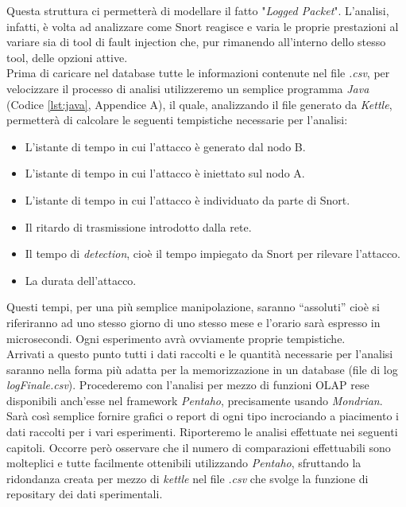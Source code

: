	Questa struttura ci permetterà di modellare il fatto "\textit{Logged Packet}". L'analisi, infatti, è volta ad analizzare come Snort reagisce e varia le proprie prestazioni al variare sia di tool di fault injection che, pur rimanendo all'interno dello stesso tool, delle opzioni attive.\\
	Prima di caricare nel database tutte le informazioni contenute nel file \textit{.csv}, per velocizzare il processo di analisi utilizzeremo un semplice programma \textit{Java} (Codice \ref{lst:java}, Appendice A), il quale, analizzando il file generato da \textit{Kettle}, permetterà di calcolare le seguenti tempistiche necessarie per l'analisi:
	\begin{itemize}
	    \item L'istante di tempo in cui l'attacco è generato dal nodo B.
	    \item L'istante di tempo in cui l'attacco è iniettato sul nodo A.
	    \item L'istante di tempo in cui l'attacco è individuato da parte di Snort.
	    \item Il ritardo di trasmissione introdotto dalla rete.
	    \item Il tempo di \textit{detection}, cioè il tempo impiegato da Snort per rilevare l'attacco.
	    \item La durata dell'attacco.
	\end{itemize}
	
	Questi tempi, per una più semplice manipolazione, saranno ``assoluti'' cioè si riferiranno ad uno stesso giorno di uno stesso mese e l'orario sarà espresso in microsecondi. Ogni esperimento avrà ovviamente proprie tempistiche.\\
	Arrivati a questo punto tutti i dati raccolti e le quantità necessarie per l'analisi saranno nella forma più adatta per la memorizzazione in un database (file di log \textit{logFinale.csv}). Procederemo con l'analisi per mezzo di funzioni OLAP rese disponibili anch'esse nel framework \textit{Pentaho}, precisamente usando \textit{Mondrian}. Sarà così semplice fornire grafici o report di ogni tipo incrociando a piacimento i dati raccolti per i vari esperimenti.
	Riporteremo le analisi effettuate nei seguenti capitoli. Occorre però osservare che il numero di comparazioni effettuabili sono molteplici e tutte facilmente ottenibili utilizzando \textit{Pentaho}, sfruttando la ridondanza creata per mezzo di \textit{kettle} nel file \textit{.csv} che svolge la funzione di repositary dei dati sperimentali.
